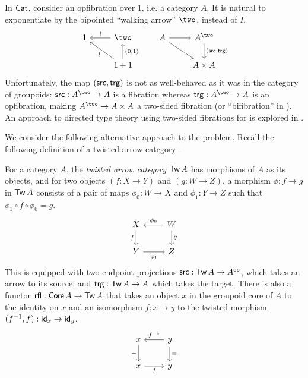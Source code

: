 In $\mathsf{Cat}$, consider an opfibration over $1$, i.e. a category $A$.
It is natural to exponentiate by the
bipointed ``walking arrow'' $\two$, instead of $I$.
\[
\begin{tikzcd}
	1 & \two & A & {A^\two} \\
	& {1+1} && {A \times A}
	\arrow["{!}"', from=1-2, to=1-1]
	\arrow[from=1-3, to=1-4]
	\arrow[from=1-3, to=2-4]
	\arrow["{{(\src, \trg)}}", from=1-4, to=2-4]
	\arrow["{!}", from=2-2, to=1-1]
	\arrow["{{(0,1)}}"', from=2-2, to=1-2]
\end{tikzcd}
\]
Unfortunately, the map $(\mathop{\mathsf{src}},\mathop{\mathsf{trg}})$
is not as well-behaved as it was in the category of groupoids:
$\src : A^\two \to A$ is a fibration
whereas $\trg : A^\two \to A$ is an opfibration,
making $A^\two \to A \times A$
a two-sided fibration (or ``bifibration'' in \cite{street1974}).
An approach to directed type theory using two-sided fibrations for
is explored in \cite{rivera2026}.

We consider the following alternative approach to the problem.
Recall the following definition of a twisted arrow category \cite{linton1965}.

\begin{definition}\label{def:twisted-arrow}
  For a category $A$,
  the \emph{twisted arrow category} $\mathop{\mathsf{Tw}} A$
  has morphisms of $A$ as its objects,
  and for two objects $(f : X \to Y)$ and $(g : W \to Z)$,
  a morphism $\phi : f \to g$ in $\mathop{\mathsf{Tw}} A$ consists of a pair of maps
  $\phi_0 : W \to X$ and $\phi_1 : Y \to Z$ such that
  $\phi_1 \circ f \circ \phi_0 = g$.
  \[ \begin{tikzcd}
    X & W \\
    Y & Z
    \arrow[""{name=0, anchor=center, inner sep=0}, "f"', from=1-1, to=2-1]
    \arrow["{\phi_0}"', from=1-2, to=1-1]
    \arrow[""{name=1, anchor=center, inner sep=0}, "g", from=1-2, to=2-2]
    \arrow["{\phi_1}"', from=2-1, to=2-2]
  \end{tikzcd}\]
  This is equipped with two endpoint projections
  $\mathop{\mathsf{src}} : \mathop{\mathsf{Tw}}{A} \to {A}^{\mathsf{op}}$,
  which takes an arrow to its source,
  and $\mathop{\mathsf{trg}} : \mathop{\mathsf{Tw}}{A} \to A$ which takes the target.
  There is also a functor
  $\mathop{\mathsf{rfl}} : \mathop{\mathsf{Core}} A \to \mathop{\mathsf{Tw}}{A}$ that takes
  an object $x$ in the groupoid core of $A$ to the identity on $x$
  and an isomorphism $f : x \to y$ to the twisted morphism
  $(f^{-1}, f) : \mathsf{id}_x \to \mathsf{id}_y$.
  \[\begin{tikzcd}
    x & {y} \\
    x & {y}
    \arrow["{=}"', from=1-1, to=2-1]
    \arrow["{f^{-1}}"', from=1-2, to=1-1]
    \arrow["{=}", from=1-2, to=2-2]
    \arrow["f"', from=2-1, to=2-2]
  \end{tikzcd}\]
\end{definition}


